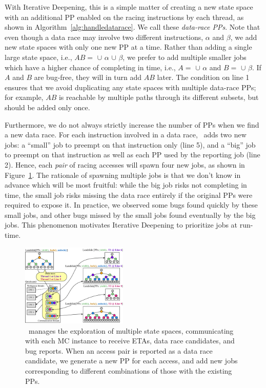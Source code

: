 With Iterative Deepening, this is a simple matter of creating a new state space with an additional PP enabled on the racing instructions by each thread, as shown in Algorithm~\ref{alg:handledatarace}.
We call these {\em data-race PPs}.
Note that even though a data race may involve two different instructions, $\alpha$ and $\beta$, we add new state spaces with only one new PP at a time.
Rather than adding a single large state space, %
i.e., $AB =$  $\cup$ $\alpha$ $\cup$ $\beta$,
we prefer to add multiple smaller jobs which have a higher chance of completing in time, i.e.,
$A =$  $\cup$ $\alpha$ and
$B =$  $\cup$ $\beta$.
If $A$ and $B$ are bug-free, they will in turn add $AB$ later.
The condition on line 1 ensures that we avoid duplicating any state spaces with multiple data-race PPs;
for example, $AB$ is reachable by multiple paths through its different subsets, but should be added only once.

Furthermore, we do not always strictly increase the number of PPs when we find a new data race.
For each instruction involved in a data race, \quicksand~adds two new jobs:
a ``small'' job to preempt on that instruction only (line 5),
and a ``big'' job to preempt on that instruction as well as each PP used by the reporting job (line 2).
%
Hence,
each {\em pair} of racing accesses will spawn four new jobs, as shown in Figure~\ref{fig:new-dr-jobs}.
%
The rationale of spawning multiple jobs is that we don't know in advance which will be most fruitful:
while the big job risks not completing in time,
the small job risks missing the data race entirely if the original PPs were required to expose it.
In practice, we observed some bugs found quickly by these small jobs, and other bugs missed by the small jobs found eventually by the big jobs.
This phenomenon motivates Iterative Deepening to prioritize jobs at run-time.

\begin{figure}[t]
	\hspace{1em}\includegraphics[width=0.45\textwidth]{dr-jobs-v2.pdf}
	\caption{\quicksand~manages the exploration of multiple state spaces, communicating with each MC instance to receive ETAs, data race candidates, and bug reports.
		When an access pair is reported as a data race candidate, we generate a new PP for each access, and add new jobs corresponding to different combinations of those with the existing PPs.}
	\label{fig:new-dr-jobs}
\end{figure}


